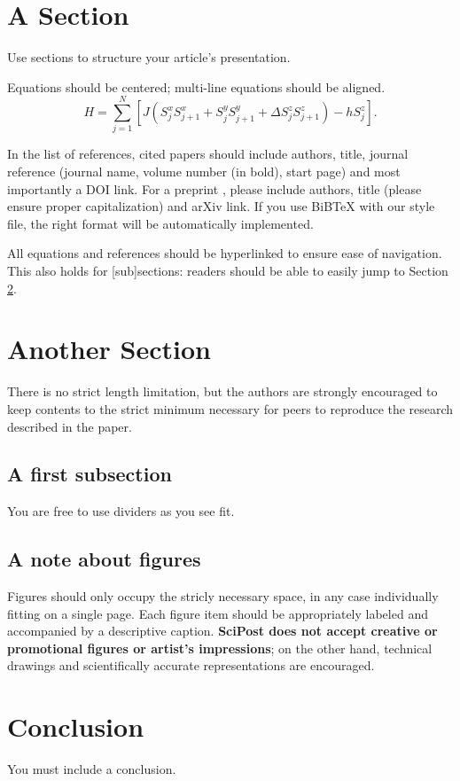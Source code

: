 \documentclass{SciPost}
\begin{document}
\section{A Section}
Use sections to structure your article's presentation.

Equations should be centered; multi-line equations should be aligned.
\begin{equation}
H = \sum_{j=1}^N \left[J (S^x_j S^x_{j+1} + S^y_j S^y_{j+1} + \Delta S^z_j S^z_{j+1}) - h S^z_j \right].
\end{equation}

In the list of references, cited papers \cite{1931_Bethe_ZP_71} should include authors, title, journal reference (journal name, volume number (in bold), start page) and most importantly a DOI link. For a preprint \cite{arXiv:1108.2700}, please include authors, title (please ensure proper capitalization) and arXiv link. If you use BiBTeX with our style file, the right format will be automatically implemented.

All equations and references should be hyperlinked to ensure ease of navigation. This also holds for [sub]sections: readers should be able to easily jump to Section \ref{sec:another}.

\section{Another Section}
\label{sec:another}
There is no strict length limitation, but the authors are strongly encouraged to keep contents to the strict minimum necessary for peers to reproduce the research described in the paper.

\subsection{A first subsection}
You are free to use dividers as you see fit.
\subsection{A note about figures}
Figures should only occupy the stricly necessary space, in any case individually fitting on a single page. Each figure item should be appropriately labeled and accompanied by a descriptive caption. {\bf SciPost does not accept creative or promotional figures or artist's impressions}; on the other hand, technical drawings and scientifically accurate representations are encouraged.


\section{Conclusion}
You must include a conclusion.
\end{document}
